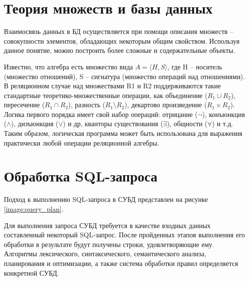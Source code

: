 \section{Теория множеств и базы данных}
\vspace{-0.5cm}
Взаимосвязь данных в БД осуществляется при помощи описания множеств -- совокупности элементов, обладающих некоторым общим свойством. Используя данное понятие, можно построить более сложные и содержательные объекты. 

Известно, что алгебра есть множество вида $A = \langle H, S \rangle$, где H -- носитель (множество отношений), S -- сигнатура (множество операций над отношениями).
В реляционном случае над множествами R1 и R2 поддерживаются такие стандартные теоретико-множественные операции, как объединение ($R_1\cup R_2$), пересечение ($R_1\cap R_2$), разность ($R_1\setminus R_2$), декартово произведение ($R_1 \times R_2$). Логика первого порядка имеет свой набор операций: отрицание ($\neg$), конъюнкция ($\land$), дизъюнкция ($\lor$) и др, кванторы существования ($\exists$), общности ($\forall$) и т.д. Таким образом, логическая программа может быть использована для выражения практически любой операции реляционной алгебры.

\section{Обработка SQL-запроса}
\vspace{-0.5cm}
Подход к выполнению SQL-запроса в СУБД представлен на рисунке \ref{image:query_plan}.
\begin{figure}[H]
	\captionsetup{justification=centering}
\end{figure}
Для выполнения запроса СУБД требуется в качестве входных данных составленный некоторый SQL-запрос. После пройденных этапов выполнения его обработки в результате будут получены строки, удовлетворяющие ему.
Алгоритмы лексического, синтаксического, семантического анализа, планирования и оптимизации, а также система обработки правил определяется конкретной СУБД.


